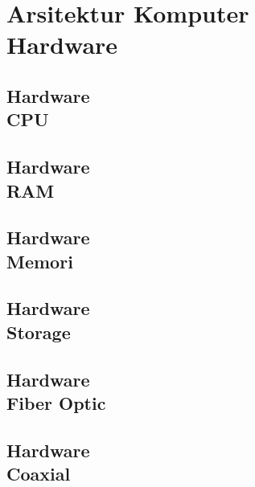 \documentclass{WileySix}
\begin{document}
\part[Hardware dan Networking]
{Arsitektur Komputer\\ Hardware}

%

\chapter[CPU atau Prosesor]
{Hardware\\ CPU}


\chapter[RAM]
{Hardware\\ RAM}


%

\chapter[Memori]
{Hardware\\ Memori}


\chapter[Storage]
{Hardware\\ Storage}



%


\chapter[Fiber Optic]
{Hardware\\ Fiber Optic}



\chapter[Coaxial]
{Hardware\\ Coaxial}


%






\printindex
\end{document}
